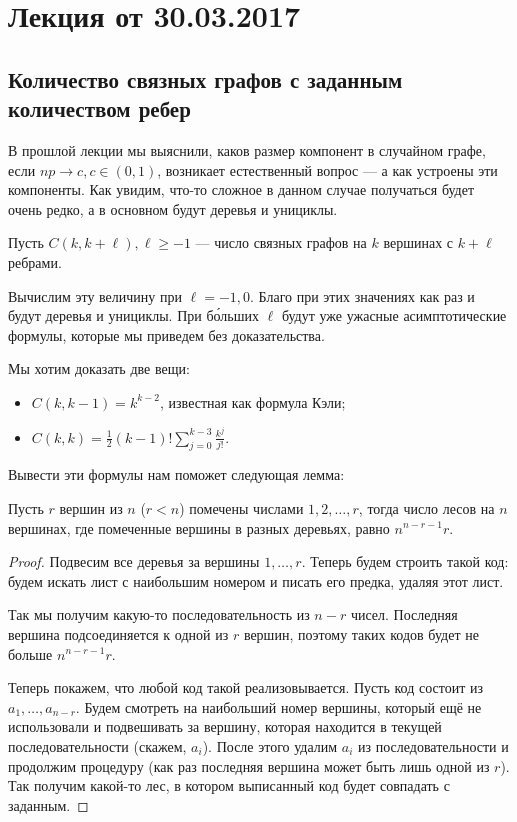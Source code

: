 \section{Лекция от 30.03.2017}

\subsection{Количество связных графов с заданным количеством ребер}

В прошлой лекции мы выяснили, каков размер компонент в случайном
графе, если $np \to c, c \in (0, 1)$, возникает естественный вопрос ---
а как устроены эти компоненты. Как увидим, что-то сложное в данном
случае получаться будет очень редко, а в основном будут деревья и унициклы.

\begin{definition}
  Пусть $C(k, k + \ell), \ell \geq -1$ --- число связных графов на $k$ вершинах
  с $k + \ell$ ребрами.
\end{definition}

Вычислим эту величину при $\ell = -1, 0$. Благо при этих значениях как раз
и будут деревья и унициклы. При б\'{о}льших $\ell$ будут уже ужасные
асимптотические формулы, которые мы приведем без доказательства.

Мы хотим доказать две вещи:

\begin{itemize}
  \item $C(k, k - 1) = k^{k - 2}$, известная как формула Кэли;
  \item $C(k, k) = \frac12 (k - 1)! \sum\limits_{j = 0}^{k - 3} \frac{k^j}{j!}$.
\end{itemize}

Вывести эти формулы нам поможет следующая лемма:

\begin{lemma}
  Пусть $r$ вершин из $n$ ($r < n$) помечены числами $1, 2, \ldots, r$, тогда число
  лесов на $n$ вершинах, где помеченные вершины в разных деревьях, равно $n^{n - r - 1}r$.
\end{lemma}

\begin{proof}
  Подвесим все деревья за вершины $1, \ldots, r$. Теперь будем строить такой код:
  будем искать лист с наибольшим номером и писать его предка, удаляя этот лист.

  Так мы получим какую-то последовательность из $n - r$ чисел. Последняя вершина
  подсоединяется к одной из $r$ вершин, поэтому таких кодов будет не больше
  $n^{n - r - 1}r$.

  Теперь покажем, что любой код такой реализовывается. Пусть
  код состоит из $a_1, \ldots, a_{n - r}$.
  Будем
  смотреть на наибольший номер вершины, который ещё не использовали и подвешивать
  за вершину, которая находится в текущей последовательности (скажем, $a_i$).
  После этого удалим $a_i$ из последовательности и продолжим процедуру 
  (как раз последняя вершина может быть лишь одной из $r$). Так
  получим какой-то лес, в котором выписанный код будет совпадать с заданным.
\end{proof}

